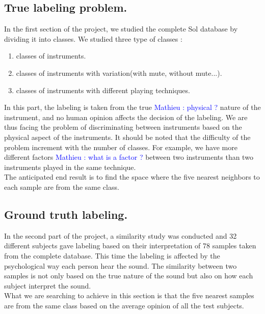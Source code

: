\documentclass[hidelinks,12pt]{report}
\newcommand{\ml}[1]{\textcolor{blue}{ Mathieu : #1}}
\begin{document}
\subsection{True labeling problem.}
In the first section of the project, we studied the complete Sol database by dividing it into classes. We studied three type of classes :
\begin{enumerate}
\item classes of instruments.
\item classes of instruments with variation(with mute, without mute...).
\item classes of instruments with different playing techniques.
\end{enumerate}
In this part, the labeling is taken from the true \ml{physical ?} nature of the instrument, and no human opinion affects the decision of the labeling. We are thus facing the problem of discriminating between instruments based on the physical aspect of the instruments. It should be noted that the difficulty of the problem increment with the number of classes. For example, we have more different factors \ml{what is a factor ?} between two instruments than two instruments played in the same technique.\\ The anticipated end result is to find the space where the five nearest neighbors to each sample are from the same class.

\subsection{Ground truth labeling.}
In the second part of the project, a similarity study was conducted and 32 different subjects gave labeling based on their interpretation of 78 samples taken from the complete database. This time the labeling is affected by the psychological way each person hear the sound. The similarity between two samples is not only based on the true nature of the sound but also on how each subject interpret the sound.\\ What we are searching to achieve in this section is that the five nearest samples are from the same class based on the average opinion of all the test subjects.
\end{document}
